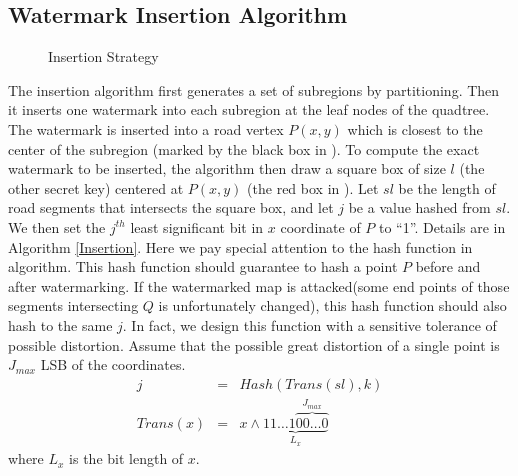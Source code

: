 \subsection{Watermark Insertion Algorithm}
\label{sec:insert}

\begin{figure}[th]
\centering
{}
\caption{Insertion Strategy %
}
\label{fig:insert}
\end{figure} 


The insertion algorithm first generates a set of subregions by partitioning. 
Then it inserts one watermark into each subregion at the leaf nodes of the 
quadtree. The watermark is inserted into a road vertex $P(x, y)$ which is
closest to the center of the subregion (marked by the black box in 
). To compute the exact watermark to be inserted, the algorithm
then draw a square box of size $l$ (the other secret key) centered at
$P(x, y)$ (the red box in ). Let $sl$ be the length of road
segments that intersects the square box, and let $j$ be a value hashed from
$sl$. We then set the $j^{th}$ least significant bit in $x$ coordinate of $P$ 
to ``1''. Details are in Algorithm \ref{Insertion}. Here we pay special
attention to the hash function in algorithm. This hash function should 
guarantee to hash a point $P$ before and after watermarking. If the watermarked map is 
attacked(some end points of those segments intersecting $Q$ is unfortunately changed),
this hash function should also hash to the same $j$. In fact, we design this 
function with a sensitive tolerance of possible distortion. Assume that the possible
great distortion of a single point is $J_{max}$ LSB of the coordinates.
\begin{eqnarray*}
j&=&Hash(Trans(sl),k)\\
Trans(x)&=& x \wedge \underbrace {11\ldots1\overbrace {00\ldots0}^{J_{max}} }_{L_{x} } 
\end{eqnarray*}
where $L_{x}$ is the bit length of $x$.

%

